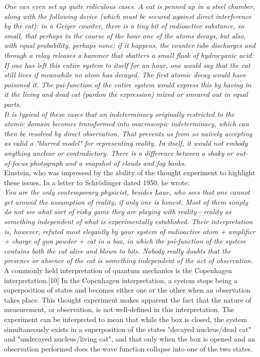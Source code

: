 \documentclass[11pt]{article}
\begin{document}
\textit{One can even set up quite ridiculous cases. A cat is penned up in a steel chamber, along with the following device (which must be secured against direct interference by the cat): in a Geiger counter, there is a tiny bit of radioactive substance, so small, that perhaps in the course of the hour one of the atoms decays, but also, with equal probability, perhaps none; if it happens, the counter tube discharges and through a relay releases a hammer that shatters a small flask of hydrocyanic acid. If one has left this entire system to itself for an hour, one would say that the cat still lives if meanwhile no atom has decayed. The first atomic decay would have poisoned it. The psi-function of the entire system would express this by having in it the living and dead cat (pardon the expression) mixed or smeared out in equal parts.\\
It is typical of these cases that an indeterminacy originally restricted to the atomic domain becomes transformed into macroscopic indeterminacy, which can then be resolved by direct observation. That prevents us from so naïvely accepting as valid a "blurred model" for representing reality. In itself, it would not embody anything unclear or contradictory. There is a difference between a shaky or out-of-focus photograph and a snapshot of clouds and fog banks.}\\


Einstein, who was impressed by the ability of the thought experiment to highlight these issues. In a letter to Schrödinger dated 1950, he wrote:\\


\textit{
You are the only contemporary physicist, besides Laue, who sees that one cannot get around the assumption of reality, if only one is honest. Most of them simply do not see what sort of risky game they are playing with reality—reality as something independent of what is experimentally established. Their interpretation is, however, refuted most elegantly by your system of radioactive atom + amplifier + charge of gun powder + cat in a box, in which the psi-function of the system contains both the cat alive and blown to bits. Nobody really doubts that the presence or absence of the cat is something independent of the act of observation.}\\


A commonly held interpretation of quantum mechanics is the Copenhagen interpretation.[10] In the Copenhagen interpretation, a system stops being a superposition of states and becomes either one or the other when an observation takes place. This thought experiment makes apparent the fact that the nature of measurement, or observation, is not well-defined in this interpretation. The experiment can be interpreted to mean that while the box is closed, the system simultaneously exists in a superposition of the states "decayed nucleus/dead cat" and "undecayed nucleus/living cat", and that only when the box is opened and an observation performed does the wave function collapse into one of the two states.\\
\end{document}
